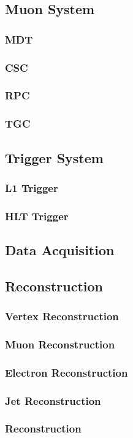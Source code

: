 \subsection{Muon System}
\subsubsection{MDT} %
\subsubsection{CSC} %
\subsubsection{RPC}
\subsubsection{TGC}
\subsection{Trigger System}
\subsubsection{L1 Trigger}
\subsubsection{HLT Trigger}
\subsection{Data Acquisition}
\subsection{Reconstruction}
\subsubsection{Vertex Reconstruction}
\subsubsection{Muon Reconstruction}
\subsubsection{Electron Reconstruction}
\subsubsection{Jet Reconstruction}
\subsubsection{\met Reconstruction}
